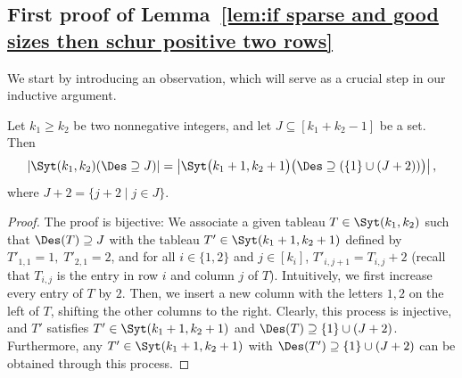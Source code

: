 \subsection{First proof of Lemma~\ref{lem:if sparse and good sizes then schur positive two rows}}
\label{subsec:proof if sparse and good sizes then schur positive two rows by induction}
We start by introducing an observation, which will serve as a crucial step in our inductive argument.
\begin{lemma}
\label{lem:remove first descent from syt}
    Let $k_1 \ge k_2$ be two nonnegative integers, and let $J \subseteq [k_1 + k_2 - 1]$ be a set. Then
    \[
        \left|\Syt(k_1, k_2)(\Des \supseteq J)\right| = \left|\Syt\big(k_1+1, k_2+1\big)\big(\Des \supseteq (\{1\}\cup (J+2))\big)\right|,
    \]
    where $J+2 = \{j + 2 \mid j \in J\}$.
\end{lemma}
\begin{proof}
    The proof is bijective: We associate a given tableau $T \in \Syt(k_1, k_2)$ such that $\Des(T) \supseteq J$ with the tableau $T' \in \Syt(k_1+1, k_2+1)$ defined by $T'_{1,1} = 1,\; T'_{2,1} = 2$, and for all $i \in \{1,2\}$ and $j \in [k_i]$, $T'_{i,j+1} = T_{i,j}+2$ (recall that $T_{i,j}$ is the entry in row $i$ and column $j$ of $T$). Intuitively, we first increase every entry of $T$ by $2$. Then, we insert a new column with the letters $1,2$ on the left of $T$, shifting the other columns to the right. Clearly, this process is injective, and $T'$ satisfies $T' \in \Syt(k_1+1, k_2+1)$ and $\Des(T) \supseteq \{1\}\cup (J+2)$. Furthermore, any $T' \in \Syt(k_1+1, k_2+1)$ with $\Des(T') \supseteq \{1\}\cup (J+2)$ can be obtained through this process.
\end{proof}

